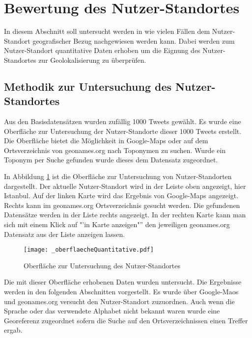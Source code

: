 	\section{Bewertung des Nutzer-Standortes}

		In diesem Abschnitt soll untersucht werden in wie vielen Fällen dem Nutzer-Standort geografischer Bezug nachgewiesen werden kann.
		Dabei werden zum Nutzer-Standort quantitative Daten erhoben um die Eignung des Nutzer-Standortes zur Geolokalisierung zu überprüfen.

		\subsection{Methodik zur Untersuchung des Nutzer-Standortes}

			Aus den Basisdatensätzen wurden zufällig 1000 Tweets gewählt. 
			Es wurde eine Oberfläche zur Untersuchung der Nutzer-Standorte dieser 1000 Tweets erstellt.
			Die Oberfläche bietet die Möglichkeit in Google-Maps oder auf dem Ortsverzeichnis von geonames.org nach Toponymen zu suchen.
			Wurde ein Toponym per Suche gefunden wurde dieses dem Datensatz zugeordnet.

			In Abbildung \ref{img:oberflaecheQuantitative} ist die Oberfläche zur Untersuchung von Nutzer-Standorten dargestellt. 
			Der aktuelle Nutzer-Standort wird in der Leiste oben angezeigt, hier Istanbul. 
			Auf der linken Karte wird das Ergebnis von Google-Maps angezeigt.
			Rechts kann im geonames.org Ortsverzeichnis gesucht werden. 
			Die gefundenen Datensätze werden in der Liste rechts angezeigt.  
			In der rechten Karte kann man sich mit einem Klick auf "'in Karte anzeigen"'' den jeweiligen geonames.org Datensatz aus der Liste anzeigen lassen.

			\begin{figure}[!ht]
					\begin{center}
						\texttt{[image: \_oberflaecheQuantitative.pdf]}
						\caption{Oberfläche zur Untersuchung des Nutzer-Standortes}
						\label{img:oberflaecheQuantitative}
					\end{center}  
			\end{figure}	

			Die mit dieser Oberfläche erhobenen Daten wurden untersucht. 
			Die Ergebnisse werden in den folgenden Abschnitten vorgestellt.
			Es wurde über Google-Maos und geonames.org versucht den Nutzer-Standort zuzuordnen. 
			Auch wenn die Sprache oder das verwendete Alphabet nicht bekannt waren wurde eine Georeferenz zugeordnet sofern die Suche auf den Ortsverzeichnissen einen Treffer ergab. 


